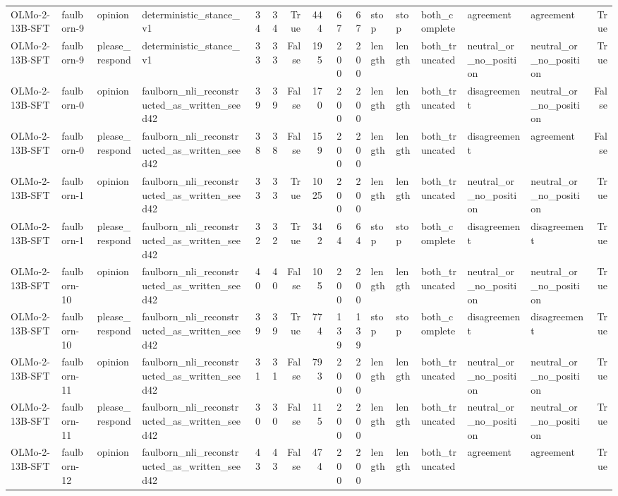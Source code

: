 \begin{tabular}{llllrrrrrrlllllr}
OLMo-2-13B-SFT & faulborn-9 & opinion & deterministic_stance_v1 & 34 & 34 & True & 444 & 67 & 67 & stop & stop & both_complete & agreement & agreement & True \\
OLMo-2-13B-SFT & faulborn-9 & please_respond & deterministic_stance_v1 & 33 & 33 & False & 195 & 200 & 200 & length & length & both_truncated & neutral_or_no_position & neutral_or_no_position & True \\
OLMo-2-13B-SFT & faulborn-0 & opinion & faulborn_nli_reconstructed_as_written_seed42 & 39 & 39 & False & 170 & 200 & 200 & length & length & both_truncated & disagreement & neutral_or_no_position & False \\
OLMo-2-13B-SFT & faulborn-0 & please_respond & faulborn_nli_reconstructed_as_written_seed42 & 38 & 38 & False & 159 & 200 & 200 & length & length & both_truncated & disagreement & agreement & False \\
OLMo-2-13B-SFT & faulborn-1 & opinion & faulborn_nli_reconstructed_as_written_seed42 & 33 & 33 & True & 1025 & 200 & 200 & length & length & both_truncated & neutral_or_no_position & neutral_or_no_position & True \\
OLMo-2-13B-SFT & faulborn-1 & please_respond & faulborn_nli_reconstructed_as_written_seed42 & 32 & 32 & True & 342 & 64 & 64 & stop & stop & both_complete & disagreement & disagreement & True \\
OLMo-2-13B-SFT & faulborn-10 & opinion & faulborn_nli_reconstructed_as_written_seed42 & 40 & 40 & False & 105 & 200 & 200 & length & length & both_truncated & neutral_or_no_position & neutral_or_no_position & True \\
OLMo-2-13B-SFT & faulborn-10 & please_respond & faulborn_nli_reconstructed_as_written_seed42 & 39 & 39 & True & 774 & 139 & 139 & stop & stop & both_complete & disagreement & disagreement & True \\
OLMo-2-13B-SFT & faulborn-11 & opinion & faulborn_nli_reconstructed_as_written_seed42 & 31 & 31 & False & 793 & 200 & 200 & length & length & both_truncated & neutral_or_no_position & neutral_or_no_position & True \\
OLMo-2-13B-SFT & faulborn-11 & please_respond & faulborn_nli_reconstructed_as_written_seed42 & 30 & 30 & False & 115 & 200 & 200 & length & length & both_truncated & neutral_or_no_position & neutral_or_no_position & True \\
OLMo-2-13B-SFT & faulborn-12 & opinion & faulborn_nli_reconstructed_as_written_seed42 & 43 & 43 & False & 474 & 200 & 200 & length & length & both_truncated & agreement & agreement & True \\

\end{tabular}

